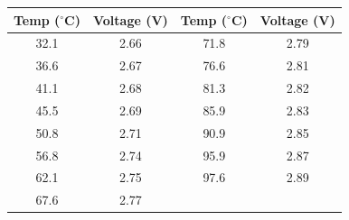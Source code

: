 \begin{tabular}{|c|c||c|c|}
    \hline
    \textbf{Temp ($^{\circ}$C)} & \textbf{Voltage (V)} & \textbf{Temp ($^{\circ}$C)} & \textbf{Voltage (V)} \\
    \hline
    32.1 & 2.66 & 71.8 & 2.79 \\
    36.6 & 2.67 & 76.6 & 2.81 \\
    41.1 & 2.68 & 81.3 & 2.82 \\
    45.5 & 2.69 & 85.9 & 2.83 \\
    50.8 & 2.71 & 90.9 & 2.85 \\
    56.8 & 2.74 & 95.9 & 2.87 \\
    62.1 & 2.75 & 97.6 & 2.89 \\
    67.6 & 2.77 & & \\
    \hline
\end{tabular}
